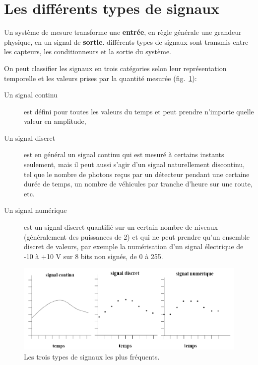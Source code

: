 \section{Les différents types de signaux}

Un système de mesure transforme une \textbf{entrée}, en règle générale une grandeur physique, en un signal de \textbf{sortie}. différents types de signaux sont transmis entre les capteurs, les conditionneurs et la sortie du système.

On peut classifier les signaux en trois catégories selon leur représentation temporelle et les valeurs prises par la quantité mesurée (fig.~\ref{fig:typsign}):
\begin{description}
    \item[Un signal continu] est défini pour toutes les valeurs du temps et peut prendre n'importe quelle valeur en amplitude,
    \item[Un signal discret] est en général un signal continu qui est mesuré à certains instants seulement, mais il peut aussi s'agir d'un signal naturellement discontinu, tel que le nombre de photons reçus par un détecteur pendant une certaine durée de temps, un nombre de véhicules par tranche d'heure sur une route, etc.
    \item[Un signal numérique] est un signal discret quantifié sur un certain nombre de niveaux (généralement des puissances de 2) et qui ne peut prendre qu'un ensemble discret de valeurs, par exemple la numérisation d'un signal électrique de -10 à +10 V sur 8 bits non signés, de 0 à 255.
\end{description}
\begin{figure}[h]
    \centering
    \includegraphics[width=16cm]{assets/figures/typesign.pdf}
    \caption{Les trois types de signaux les plus fréquents.}\vspace{5mm}
    \label{fig:typsign}
\end{figure}

